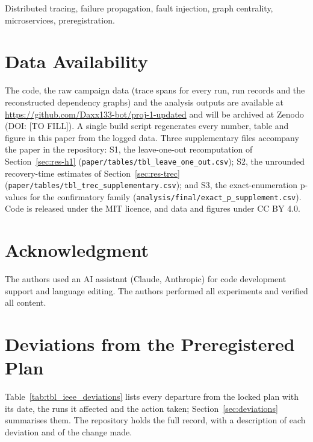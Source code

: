\documentclass[journal]{IEEEtran}
\begin{document}
\begin{IEEEkeywords}
Distributed tracing, failure propagation, fault injection, graph centrality, microservices,
preregistration.
\end{IEEEkeywords}










\section*{Data Availability}
The code, the raw campaign data (trace spans for every run, run records and the reconstructed
dependency graphs) and the analysis outputs are available at
\url{https://github.com/Daxx133-bot/proj-1-updated} and will be archived at Zenodo (DOI: [TO
FILL]). A single build script regenerates every number, table and figure in this paper from
the logged data. Three supplementary files accompany the paper in the repository: S1, the
leave-one-out recomputation of Section~\ref{sec:res-h1}
(\texttt{paper/tables/tbl\_leave\_one\_out.csv}); S2, the unrounded recovery-time estimates of
Section~\ref{sec:res-trec} (\texttt{paper/tables/tbl\_trec\_supplementary.csv}); and S3, the
exact-enumeration p-values for the confirmatory family
(\texttt{analysis/final/exact\_p\_supplement.csv}). Code is released under the MIT licence,
and data and figures under CC BY 4.0.

\section*{Acknowledgment}
The authors used an AI assistant (Claude, Anthropic) for code development support and
language editing. The authors performed all experiments and verified all content.




\appendices
\section{Deviations from the Preregistered Plan}
\label{app:deviations}
Table~\ref{tab:tbl_ieee_deviations} lists every departure from the locked plan with its date,
the runs it affected and the action taken; Section~\ref{sec:deviations} summarises them. The
repository holds the full record, with a description of each deviation and of the change made.

\end{document}
